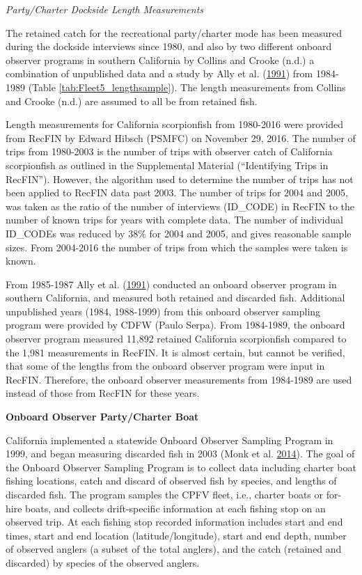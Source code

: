 \documentclass[12pt,]{article}
\begin{document}
\emph{Party/Charter Dockside Length Measurements}

The retained catch for the recreational party/charter mode has been
measured during the dockside interviews since 1980, and also by two
different onboard observer programs in southern California by Collins
and Crooke (n.d.) a combination of unpublished data and a study by Ally
et al. (\protect\hyperlink{ref-Ally1991}{1991}) from 1984-1989 (Table
\ref{tab:Fleet5_lengthsample}). The length measurements from Collins and
Crooke (n.d.) are assumed to all be from retained fish.

Length measurements for California scorpionfish from 1980-2016 were
provided from RecFIN by Edward Hibsch (PSMFC) on November 29, 2016. The
number of trips from 1980-2003 is the number of trips with observer
catch of California scorpionfish as outlined in the Supplemental
Material (``Identifying Trips in RecFIN''). However, the algorithm used
to determine the number of trips has not been applied to RecFIN data
past 2003. The number of trips for 2004 and 2005, was taken as the ratio
of the number of interviews (ID\_CODE) in RecFIN to the number of known
trips for years with complete data. The number of individual ID\_CODEs
was reduced by 38\% for 2004 and 2005, and gives reasonable sample
sizes. From 2004-2016 the number of trips from which the samples were
taken is known.

From 1985-1987 Ally et al. (\protect\hyperlink{ref-Ally1991}{1991})
conducted an onboard observer program in southern California, and
measured both retained and discarded fish. Additional unpublished years
(1984, 1988-1999) from this onboard observer sampling program were
provided by CDFW (Paulo Serpa). From 1984-1989, the onboard observer
program measured 11,892 retained California scorpionfish compared to the
1,981 measurements in RecFIN. It is almost certain, but cannot be
verified, that some of the lengths from the onboard observer program
were input in RecFIN. Therefore, the onboard observer measurements from
1984-1989 are used instead of those from RecFIN for these years.

\textbf{Onboard Observer Party/Charter Boat}

California implemented a statewide Onboard Observer Sampling Program in
1999, and began measuring discarded fish in 2003 (Monk et al.
\protect\hyperlink{ref-Monk2014}{2014}). The goal of the Onboard
Observer Sampling Program is to collect data including charter boat
fishing locations, catch and discard of observed fish by species, and
lengths of discarded fish. The program samples the CPFV fleet, i.e.,
charter boats or for-hire boats, and collects drift-specific information
at each fishing stop on an observed trip. At each fishing stop recorded
information includes start and end times, start and end location
(latitude/longitude), start and end depth, number of observed anglers (a
subset of the total anglers), and the catch (retained and discarded) by
species of the observed anglers.
\end{document}
